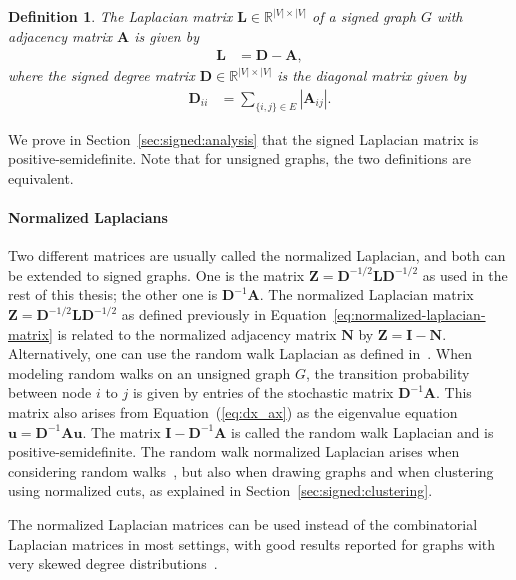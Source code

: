 \documentclass[11pt,a4paper]{book}
\newtheorem{mydef}{Definition}
\begin{document}
\begin{mydef}
  \label{def:signed-laplacian}
  The Laplacian matrix $\mathbf L\in \mathbb R^{|V| \times |V|}$ of
  a signed graph $G$ with adjacency matrix $\mathbf A$ is
  given by
  \begin{align}
    \mathbf L &= \mathbf D - \mathbf A,
  \end{align}
  where the signed degree matrix $\mathbf D \in \mathbb{R}^{|V| \times |V|}$ is
  the diagonal matrix given by
  \begin{align}
    \mathbf D_{ii} &= \sum_{\{i,j\}\in E} |\mathbf A_{ij}|. \label{eq:signed-degree}
  \end{align}
\end{mydef}

We prove in Section~\ref{sec:signed:analysis} that the signed
Laplacian matrix is positive-semidefinite. 
Note that for unsigned graphs, the two definitions are equivalent. 

\paragraph{Normalized Laplacians}
Two different matrices are usually called the normalized Laplacian, and
both can be extended to signed graphs.  One is the matrix $\mathbf Z =
\mathbf D^{-1/2}\mathbf L \mathbf D^{-1/2}$ as used in the rest of this
thesis; the other one is $\mathbf D^{-1}\mathbf A$.  The normalized
Laplacian matrix $\mathbf Z = \mathbf D^{-1/2} \mathbf L
\mathbf D^{-1/2}$ as defined previously in
Equation~\ref{eq:normalized-laplacian-matrix} is 
related to the normalized adjacency matrix $\mathbf N$ by $\mathbf Z =
\mathbf I - \mathbf N$.  Alternatively, one can use the random walk
Laplacian as defined in~\cite{b304}.  When modeling random walks on an
unsigned graph $G$, the transition probability between node $i$ to $j$
is given by entries of the stochastic matrix $\mathbf D^{-1}\mathbf A$.
This matrix also arises from Equation~(\ref{eq:dx_ax}) as the eigenvalue
equation $\mathbf u = \mathbf D^{-1}\mathbf A \mathbf u$.  The matrix
$\mathbf I-\mathbf D^{-1}\mathbf A$ is called the random walk Laplacian
and is positive-semidefinite.  The random walk normalized Laplacian
arises when considering random walks~\cite{b19}, but also when drawing
graphs and when clustering using normalized cuts, as explained in
Section~\ref{sec:signed:clustering}.

The normalized Laplacian matrices can be used instead of the
combinatorial Laplacian matrices in most settings, with 
good results reported for graphs with very skewed degree
distributions~\cite{b320}. 
\end{document}
